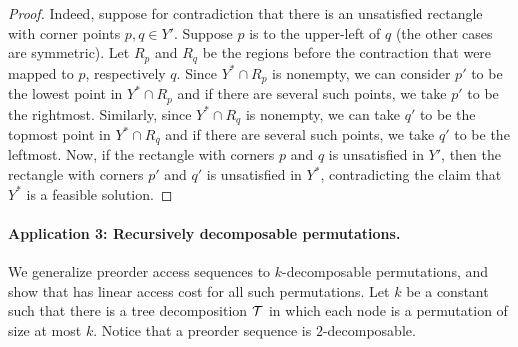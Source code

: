 \begin{proof}
Indeed, suppose for contradiction that there is an unsatisfied rectangle with corner points $p,q \in Y'$. Suppose $p$ is to the upper-left of $q$ (the other cases are symmetric). Let $R_p$ and $R_q$ be the regions before the contraction that were mapped to $p$, respectively $q$. Since $Y^* \cap R_p$ is nonempty, we can consider $p'$ to be the lowest point in $Y^* \cap R_p$ and if there are several such points, we take $p'$ to be the rightmost. Similarly, since $Y^* \cap R_q$ is nonempty, we can take $q'$ to be the topmost point in $Y^* \cap R_q$ and if there are several such points, we take $q'$ to be the leftmost. Now, if the rectangle with corners $p$ and $q$ is unsatisfied in $Y'$, then the rectangle with corners $p'$ and $q'$ is unsatisfied in $Y^*$, contradicting the claim that $Y^*$ is a feasible solution.
\end{proof} 

\paragraph{Application 3: Recursively decomposable permutations.}
We generalize preorder access sequences to $k$-decomposable permutations, and show that \agreedy has linear access cost for all such permutations.  
Let $k$ be a constant such that there is a tree decomposition ${\mathcal T}$ in which each node is a permutation of size at most $k$. Notice that a preorder sequence is $2$-decomposable.

